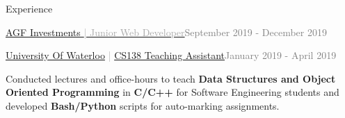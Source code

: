 \documentclass[hidelinks]{resume} %
\begin{document}
\begin{rSection}{\faBlackTie \hspace{0.25px} Experience}
\begin{rSubsection}{\href{https://www.agf.com/ca/en/index.jsp}{AGF Investments \textcolor{darkgray}{| Junior Web Developer}}}{\textcolor{gray}{September 2019 - December 2019}}{}
\begin{bulletpoints}
             \vspace{-.25cm}
        \end{bulletpoints}
\end{rSubsection}
\begin{rSubsection}{\href{https://cs.uwaterloo.ca/}{University Of Waterloo} \textcolor{darkgray}{| \href{https://www.student.cs.uwaterloo.ca/~cs138/}{CS138 Teaching Assistant}}}{\textcolor{gray}{January 2019 - April 2019}}{}

    \begin{bulletpoints}
        \vspace{-.10cm}
        \item Conducted lectures and office-hours to teach \textbf{Data Structures and Object Oriented Programming} in \textbf{C/C++} for Software Engineering students and developed \textbf{Bash/Python} scripts for auto-marking assignments.
        \vspace{-.25cm}
    \end{bulletpoints}   

\end{rSubsection}

\end{rSection}

\vspace{-.05cm}
\end{document}

